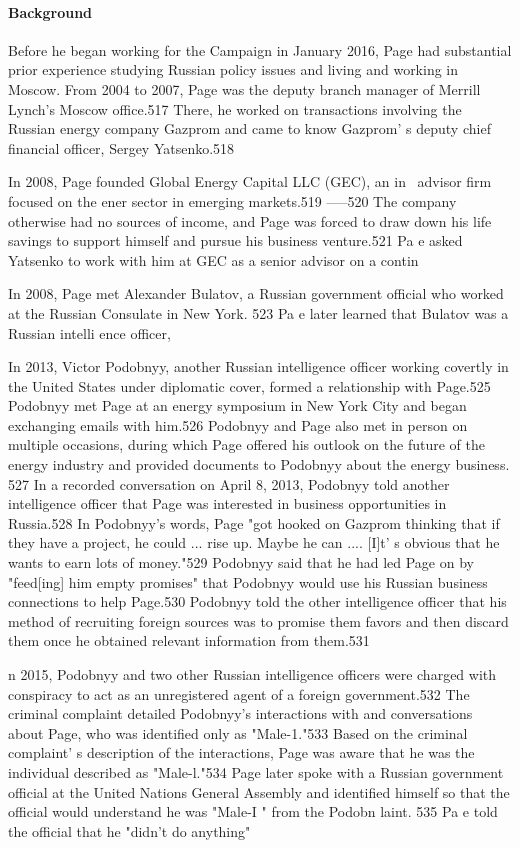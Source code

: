 \paragraph{Background}

Before he began working for the Campaign in January 2016, Page had substantial prior experience studying Russian policy issues and living and working in Moscow. From 2004 to 2007, Page was the deputy branch manager of Merrill Lynch's Moscow office.517 There, he worked on transactions involving the Russian energy company Gazprom and came to know Gazprom' s deputy chief financial officer, Sergey Yatsenko.518

In 2008, Page founded Global Energy Capital LLC (GEC), an in~ advisor firm focused on the ener sector in emerging markets.519 -----520 The company otherwise had no sources of income,  and Page was forced to draw down his life savings to support himself and pursue his business venture.521 Pa e asked Yatsenko to work with him at GEC as a  senior advisor on a contin

In 2008, Page met Alexander Bulatov, a  Russian government official who worked at the Russian Consulate in New York. 523 Pa e  later learned that Bulatov was a  Russian intelli ence officer,

In 2013,  Victor Podobnyy, another Russian intelligence officer working covertly in the United States under diplomatic cover, formed a relationship with Page.525 Podobnyy met Page at an energy symposium in New York City and began exchanging emails with him.526 Podobnyy and Page also met in person on multiple occasions, during which Page offered his outlook on the future of the energy industry and provided documents to Podobnyy about the energy business. 527 In a recorded conversation on April 8, 2013, Podobnyy told another intelligence officer that Page was interested in business opportunities in Russia.528 In Podobnyy's words, Page "got hooked on Gazprom thinking that if they have a project, he could ... rise up. Maybe he can .... [I]t' s obvious that he wants to earn lots of money."529 Podobnyy said that he had led Page on by "feed[ing] him empty promises"  that Podobnyy would use his Russian business connections to help Page.530 Podobnyy told the other intelligence officer that his method of recruiting foreign sources was to promise them favors and then discard them once he obtained relevant information from them.531

n 2015, Podobnyy and two other Russian intelligence officers were charged with conspiracy to act as an unregistered agent of a  foreign government.532 The criminal complaint detailed Podobnyy's interactions with and conversations about Page, who was identified only as "Male-1."533 Based on the criminal complaint' s description of the interactions, Page was aware that he was the individual described as "Male-l."534 Page later spoke with a Russian government official at the United Nations General Assembly and identified himself so that the official would understand he was "Male-I " from the Podobn laint. 535 Pa e told the official that he "didn't do anything"

